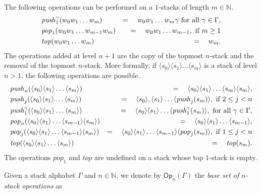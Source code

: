 \documentclass[a4paper,UKenglish,cleveref, autoref, thm-restate]{lipics-v2021}
\newcommand{\N}{\mathbb{N}}
\newcommand{\Op}{\mathsf{Op}}
\begin{document}
The following operations can be performed on a $1$-stacks of length $m \in \N$.
\begin{eqnarray*}
&\text{\textit{push}}_1^\gamma( w_0 w_1 \ldots w_m) &=\quad w_0 w_1 \ldots w_m \gamma   \text{ for all } \gamma \in  \Gamma, \\
&\text{\textit{pop}}_1(w_0 w_1 \ldots w_{m-1} w_m ) &=\quad w_0 w_1 \ldots w_{m-1}, \text{ if } m \geq 1\\
&\text{\textit{top}}( w_0 w_1 \ldots w_m ) &=\quad w_m.
\end{eqnarray*}
The operations added at level $n+1$ are the copy of the topmost $n$-stack
and the removal of the topmost $n$-stack.
More formally, if $ \langle s_0 \rangle \langle s_1 \rangle \ldots \langle s_m \rangle$ is a stack of 
level $n > 1$, 
the following operations are possible. 
%
\begin{eqnarray*}
&\text{\textit{push}}_n( \langle s_0 \rangle \langle s_1 \rangle \ldots \langle s_m \rangle) &=\quad  \langle s_0 \rangle \langle s_1 \rangle \ldots \langle s_m \rangle \langle s_m \rangle , \\
&\text{\textit{push}}_j( \langle s_0 \rangle \langle s_1 \rangle \ldots \langle s_m \rangle) &=\quad \langle s_0 \rangle, \langle s_1 \rangle \ldots 
\langle \text{\textit{push}}_j(s_m) \rangle,
\text{ if } 2 \leq j < n\\
&\text{\textit{push}}_1^\gamma( \langle s_0 \rangle \langle s_1 \rangle \ldots \langle s_m \rangle) &= \quad
\langle s_0 \rangle \langle s_1 \rangle \ldots 
\langle \text{\textit{push}}_1^\gamma(s_m) \rangle,
\text{ for all } \gamma \in \Gamma,\\
&\text{\textit{pop}}_n( \langle s_0 \rangle \langle s_1 \rangle \ldots \langle s_{m-1} \rangle \langle s_m \rangle) &= \quad
\langle s_0 \rangle \langle s_1 \rangle \ldots \langle s_{m-1} \rangle
,\\
&\text{\textit{pop}}_j( \langle s_0 \rangle \langle s_1 \rangle \ldots \langle s_{m-1} \rangle \langle s_m \rangle) &= \quad
\langle s_0 \rangle \langle s_1 \rangle \ldots \langle s_{m-1} \rangle
\langle \text{\textit{pop}}_j(s_m) \rangle,
\text{ if } 1 \leq j < n\\
&\text{\textit{top}}( \langle s_0 \rangle \langle s_1 \rangle \ldots \langle s_m \rangle) &=\quad
\text{\textit{top}}(s_m).
\end{eqnarray*}
The operations $pop_1$ and $top$ are undefined on a stack whose top $1$-stack is empty.  


Given a stack alphabet $\Gamma$ and $n \in \N$, 
we denote by  $\Op_n(\Gamma)$ the {\em base set of $n$-stack operations} as
\end{document}

